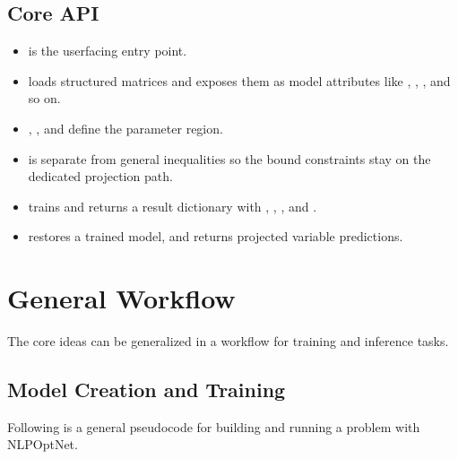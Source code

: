 \documentclass[letterpaper,10pt,english,openany,oneside]{sphinxmanual}
\begin{document}
\section{Core API}
\label{\detokenize{index:core-api}}\begin{itemize}
\item {} 
\sphinxAtStartPar
{} is the user\sphinxhyphen{}facing entry point.

\item {} 
\sphinxAtStartPar
{} loads structured matrices and exposes them as
model attributes like , , , and so on.

\item {} 
\sphinxAtStartPar
{}, , and  define the
parameter region.

\item {} 
\sphinxAtStartPar
{} is separate from general inequalities so the
bound constraints stay on the dedicated projection path.

\item {} 
\sphinxAtStartPar
{} trains and returns a result dictionary with ,
, , and .

\item {} 
\sphinxAtStartPar
{} restores a trained model, and
 returns projected variable predictions.

\end{itemize}


\chapter{General Workflow}
\label{\detokenize{index:general-workflow}}
\sphinxAtStartPar
The core ideas can be generalized in a workflow for training and inference tasks.


\section{Model Creation and Training}
\label{\detokenize{index:model-creation-and-training}}
\sphinxAtStartPar
Following is a general pseudocode for building and running a problem with NLPOpt\sphinxhyphen{}Net.
\end{document}

